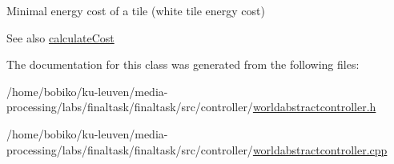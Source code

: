 Minimal energy cost of a tile (white tile energy cost) 

\begin{DoxySeeAlso}{See also}
\hyperlink{classWorldAbstractController_a556c8e2b55b017f5e837db2b58d3553e}{calculate\+Cost} 
\end{DoxySeeAlso}


The documentation for this class was generated from the following files\+:\begin{DoxyCompactItemize}
\item 
/home/bobiko/ku-\/leuven/media-\/processing/labs/finaltask/finaltask/src/controller/\hyperlink{worldabstractcontroller_8h}{worldabstractcontroller.\+h}\item 
/home/bobiko/ku-\/leuven/media-\/processing/labs/finaltask/finaltask/src/controller/\hyperlink{worldabstractcontroller_8cpp}{worldabstractcontroller.\+cpp}\end{DoxyCompactItemize}
